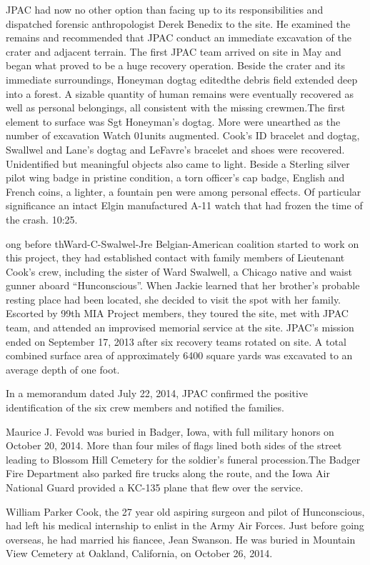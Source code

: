 \documentclass{article}
\begin{document}
\begin{multicols}{3}
JPAC had now no other option than facing up to its responsibilities and dispatched forensic anthropologist Derek Benedix to the site. He examined the remains and recommended that JPAC conduct an immediate excavation of the crater and adjacent terrain. The first JPAC team arrived on site in May and began what proved to be a huge recovery operation. Beside the crater and its immediate surroundings, Honeyman dogtag editedthe debris field extended deep into a forest. A sizable quantity of human remains were eventually recovered as well as personal belongings, all consistent with the missing crewmen.The first element to surface was Sgt Honeyman’s dogtag. More were unearthed as the number of excavation Watch 01units augmented. Cook’s ID bracelet and dogtag, Swallwel and Lane’s dogtag and LeFavre’s bracelet and shoes were recovered. Unidentified but meaningful objects also came to light. Beside  a Sterling silver pilot wing badge in pristine condition, a torn officer’s cap badge,  English and French coins, a lighter, a fountain pen were among personal effects. Of particular significance an intact Elgin manufactured A-11 watch that had frozen the time of the crash. 10:25.

ong before thWard-C-Swalwel-Jre Belgian-American coalition started to work on this project, they had established contact with family members of Lieutenant Cook’s crew, including the sister of Ward Swalwell, a Chicago native and waist gunner aboard “Hunconscious”. When Jackie learned that her brother’s probable resting place had been located, she decided to visit the spot with her family. Escorted by 99th MIA Project members, they toured the site, met with JPAC team, and attended an improvised memorial service at the site. JPAC’s mission ended on September 17, 2013 after six recovery teams rotated on site. A total combined surface area of approximately 6400 square yards was excavated to an average depth of one foot.

In a memorandum dated July 22, 2014, JPAC confirmed the positive identification of the six crew members and notified the families.

Maurice J. Fevold was buried in Badger, Iowa, with full military honors on October 20, 2014. More than four miles of flags lined both sides of the street leading to Blossom Hill Cemetery for the soldier’s funeral procession.The Badger Fire Department also parked fire trucks along the route, and the Iowa Air National Guard provided a KC-135 plane that flew over the service.

William Parker Cook, the 27 year old aspiring surgeon and pilot of Hunconscious, had left his medical internship to enlist in the Army Air Forces. Just before going overseas, he had married his fiancee, Jean Swanson. He was buried in Mountain View Cemetery at Oakland, California, on October 26, 2014.


\end{multicols}
\end{document}
